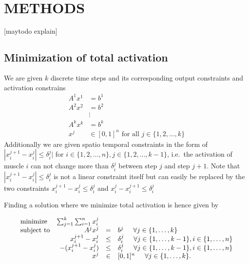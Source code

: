 \section{METHODS}
[maytodo explain]
\subsection{Minimization of total activation}
\label{sub:minimization_of_total_activation} %
We are given $k$ discrete time steps and its corresponding output constraints and activation constrains
\begin{align*}
A^1 x^1 &= b^1 \\
A^2 x^2 &= b^2 \\
 &\vdots \\
A^k x^k &= b^k \\
x^j &\in [0,1]^n \text{ for all } j \in \{1,2,\dots,k\} 
\end{align*}
Additionally we are given spatio temporal constraints in the form of $|x_i^{j+1} - x_i^{j}| \leq \delta_i^j|$ for $i \in \{1,2,\dots,n\}, j \in \{1,2,\dots,k-1\}$, i.e.\ the activation of muscle $i$ can not change more than $\delta_i^j$ between step $j$ and step $j+1$. Note that $|x_i^{j+1} - x_i^{j}| \leq \delta_i^j$ is not a linear constraint itself but can easily be replaced by the two constraints $x_i^{j+1} - x_i^{j} \leq \delta_i^j$ and $x_i^{j} - x_i^{j+1} \leq \delta_i^j$

Finding a solution where we minimize total activation is hence given by

\begin{equation}
\begin{array}{lrcl}
\mbox{minimize} & \sum_{j=1}^k \sum_{i=1}^n x_i^j \\ 
\mbox{subject to} & A^j x^j &=& b^j \hspace{5mm} \forall j \in \{1,\dots, k\} \\
  & x_i^{j+1} - x_i^{j} &\leq& \delta_i^j  \hspace{5mm} \forall j \in \{1,\dots, k-1\}, i \in \{1,\dots,n\} \\
  &  -(x_i^{j+1} - x_i^{j}) &\leq& \delta_i^j  \hspace{5mm} \forall j \in \{1,\dots, k-1\}, i \in \{1,\dots,n\} \\
  & x^j &\in& [0,1]^n \hspace{5mm} \forall j \in \{1,\dots, k\}.
\end{array}
\end{equation}

